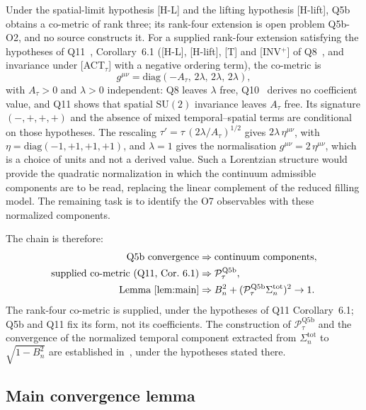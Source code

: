 \documentclass[11pt]{article}
\begin{document}
    Under the spatial-limit hypothesis [H-L] and the lifting hypothesis [H-lift], Q5b obtains a co-metric of rank
    three; its rank-four extension is open problem Q5b-O2, and no source constructs it.
    For a supplied rank-four extension satisfying the hypotheses of Q11~\cite{Beau2026q11}, Corollary~6.1
    ([H-L], [H-lift], [T] and [INV$^+$] of Q8~\cite{BeauQ8}, and invariance under [ACT$_\tau$] with a negative
    ordering term), the co-metric is
    \[
      g^{\mu\nu} = \mathrm{diag}(-A_\tau,\, 2\lambda,\, 2\lambda,\, 2\lambda),
    \]
    with $A_\tau > 0$ and $\lambda > 0$ independent: Q8 leaves $\lambda$ free, Q10~\cite{Beau2026q10} derives no
    coefficient value, and Q11 shows that spatial $\mathrm{SU}(2)$ invariance leaves $A_\tau$ free.
    Its signature $(-,+,+,+)$ and the absence of mixed temporal--spatial terms are conditional on those
    hypotheses.
    The rescaling $\tau' = \tau\,(2\lambda/A_\tau)^{1/2}$ gives $2\lambda\,\eta^{\mu\nu}$, with
    $\eta = \mathrm{diag}(-1,+1,+1,+1)$, and $\lambda = 1$ gives the normalisation
    $g^{\mu\nu} = 2\,\eta^{\mu\nu}$, which is a choice of units and not a derived value.
    Such a Lorentzian structure would provide the quadratic normalization in which the
    continuum admissible components are to be read, replacing the linear complement
    of the reduced filling model.
    The remaining task is to identify the O7 observables with these normalized
    components.

    The chain is therefore:
    \begin{align*}
      \text{Q5b convergence}
      &\Rightarrow \text{continuum components},\\
      \text{supplied co-metric (Q11, Cor.~6.1)}
      &\Rightarrow \mathcal{P}_\tau^{\mathrm{Q5b}},\\
      \text{Lemma~\ref{lem:main}}
      &\Rightarrow
      B_n^2 + (\mathcal{P}_\tau^{\mathrm{Q5b}}\Sigma_n^{\mathrm{tot}})^2 \to 1.
    \end{align*}
    The rank-four co-metric is supplied, under the hypotheses of Q11 Corollary~6.1; Q5b and Q11 fix its form, not
    its coefficients.
    The construction of $\mathcal{P}_\tau^{\mathrm{Q5b}}$ and the convergence of the normalized temporal component
    extracted from $\Sigma_n^{\mathrm{tot}}$ to $\sqrt{1-B_n^2}$ are established in~\cite{Beau2026tp}, under the
    hypotheses stated there.

  \subsection{Main convergence lemma}
\end{document}
